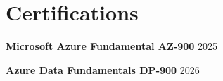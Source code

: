 \section{Certifications}

\begin{entrylist}

\item \href{https://learn.microsoft.com/api/credentials/share/en-us/JaysonChan-6978/77916783E5E2DE4B?sharingId=323B8C4E6D65E83B}{\textbf{Microsoft Azure Fundamental AZ-900}} \hfill 2025
\item \href{https://learn.microsoft.com/api/credentials/share/en-us/JaysonChan-6978/33C0790B0C59D2A7?sharingId=323B8C4E6D65E83B}{\textbf{Azure Data Fundamentals DP-900}} \hfill 2026\\
\end{entrylist}
